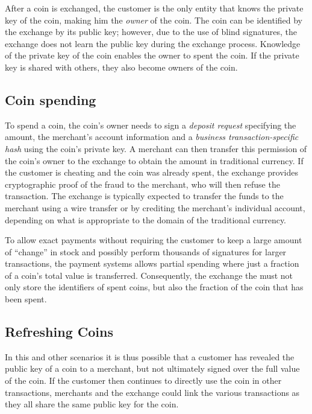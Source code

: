 \documentclass{llncs}
\begin{document}
After a coin is exchanged, the customer is the only entity that knows the
private key of the coin, making him the \emph{owner} of the coin.
The coin can be identified by the exchange by its public key; however, due
to the use of blind signatures, the exchange does not learn the public key
during the exchange process.  Knowledge of the private key of the coin
enables the owner to spent the coin.  If the private key is shared
with others, they also become owners of the coin.

\subsection{Coin spending}

To spend a coin, the coin's owner needs to sign a {\em deposit
  request} specifying the amount, the merchant's account information
and a {\em business transaction-specific hash} using the coin's
private key.  A merchant can then transfer this permission of the
coin's owner to the exchange to obtain the amount in traditional currency.
If the customer is cheating and the coin was already spent, the exchange
provides cryptographic proof of the fraud to the merchant, who will
then refuse the transaction.  The exchange is typically expected to
transfer the funds to the merchant using a wire transfer or by
crediting the merchant's individual account, depending on what is
appropriate to the domain of the traditional currency.

To allow exact payments without requiring the customer to keep a large
amount of ``change'' in stock and possibly perform thousands of
signatures for larger transactions, the payment systems allows partial
spending where just a fraction of a coin's total value is transferred.
Consequently, the exchange the must not only store the identifiers of
spent coins, but also the fraction of the coin that has been spent.


\subsection{Refreshing Coins}

In this and other scenarios it is thus possible that a customer has
revealed the public key of a coin to a merchant, but not ultimately
signed over the full value of the coin.  If the customer then
continues to directly use the coin in other transactions, merchants
and the exchange could link the various transactions as they all share the
same public key for the coin.
\end{document}
